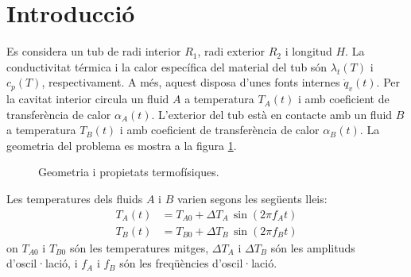 
\clearpage

\section{Introducció}

Es considera un tub de radi interior $R_1$, radi exterior $R_2$ i longitud $H$. La conductivitat térmica i la calor específica del material del tub són $\lambda_t(T)$ i $c_p(T)$, respectivament. A més, aquest disposa d'unes fonts internes $\dot{q}_v(t)$. Per la cavitat interior circula un fluid $A$ a temperatura $T_A(t)$ i amb coeficient de transferència de calor $\alpha_A(t)$. L'exterior del tub està en contacte amb un fluid $B$ a temperatura $T_B(t)$ i amb coeficient de transferència de calor $\alpha_B(t)$. La geometria del problema es mostra a la figura \ref{fig:plantejament_problema}.

\begin{figure}[h]
	\centering
	\caption{Geometria i propietats termofísiques.}
	\label{fig:plantejament_problema}
\end{figure}

\noindent
Les temperatures dels fluids $A$ i $B$ varien segons les següents lleis:
\begin{align}
	T_A(t) &= T_{A0} + \Delta T_A \, \sin(2 \pi f_A t) \\
	T_B(t) &= T_{B0} + \Delta T_B \, \sin(2 \pi f_B t)
\end{align}
on $T_{A0}$ i $T_{B0}$ són les temperatures mitges, $\Delta T_A$ i $\Delta T_B$ són les amplituds d'oscil·lació, i $f_A$ i $f_B$ són les freqüències d'oscil·lació. 


